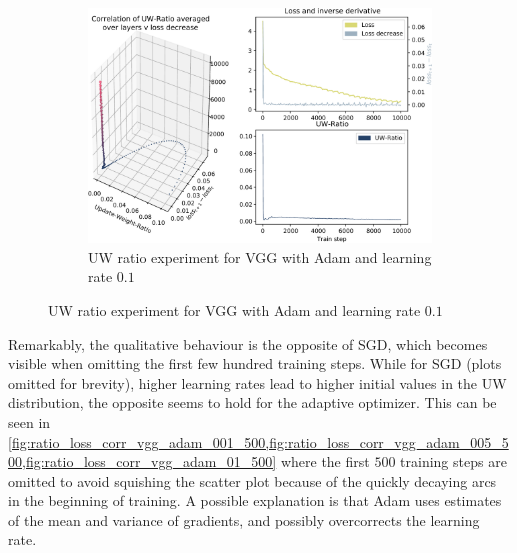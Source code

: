 \begin{figure}
    \begin{subfigure}{\textwidth}
        \centering
        \includegraphics[width=\linewidth]{gfx/diagrams/experiments/ratio_loss_correlation/vgg_adam_01_0_10000.pdf}
        \caption{UW ratio experiment for VGG with Adam and learning rate $0.1$}
        \label{fig:ratio_loss_corr_vgg_adam_01}
    \end{subfigure}
\end{figure}

Remarkably, the qualitative behaviour is the opposite of SGD, which becomes visible
when omitting the first few hundred training steps. While for SGD (plots omitted
for brevity), higher learning rates lead to higher initial values in the UW
distribution, the opposite seems to hold for the adaptive optimizer. This can be
seen in
\cref{fig:ratio_loss_corr_vgg_adam_001_500,fig:ratio_loss_corr_vgg_adam_005_500,fig:ratio_loss_corr_vgg_adam_01_500}
where the first $500$ training steps are omitted to avoid squishing the
scatter plot because of the quickly decaying arcs in the beginning of training.
A possible explanation is that Adam uses estimates of the mean and variance of
gradients, and possibly overcorrects the learning rate.

